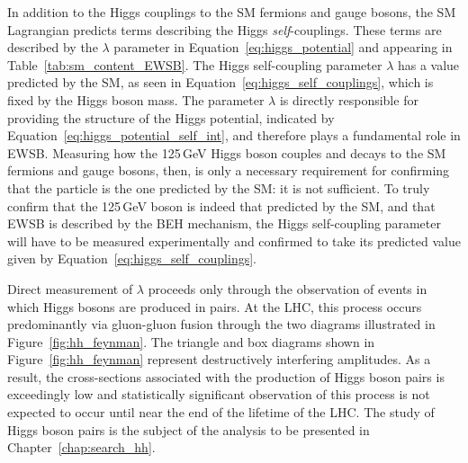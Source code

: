 In addition to the Higgs couplings to the SM fermions and gauge bosons, the SM Lagrangian
predicts terms describing the Higgs \textit{self}-couplings.
These terms are described by the $\lambda$ parameter in Equation~\ref{eq:higgs_potential}
and appearing in Table~\ref{tab:sm_content_EWSB}.
The Higgs self-coupling parameter $\lambda$ has a value predicted by the SM, as seen in 
Equation~\ref{eq:higgs_self_couplings}, which is fixed by the Higgs boson mass.
The parameter $\lambda$ is directly responsible for providing the structure of the Higgs potential,
indicated by Equation~\ref{eq:higgs_potential_self_int}, and therefore plays a fundamental
role in EWSB.
Measuring how the 125\,GeV Higgs boson couples and decays to the SM fermions and gauge bosons,
then, is only a necessary requirement for confirming that the particle is the one predicted by
the SM: it is not sufficient.
To truly confirm that the 125\,GeV boson is indeed that predicted by the SM, and that EWSB
is described by the BEH mechanism, the Higgs self-coupling parameter will have to be measured
experimentally and confirmed to take its predicted value given by Equation~\ref{eq:higgs_self_couplings}.

Direct measurement of $\lambda$ proceeds only through the observation of events in which Higgs bosons
are produced in pairs.
At the LHC, this process occurs predominantly via gluon-gluon fusion through the two diagrams illustrated
in Figure~\ref{fig:hh_feynman}.
The triangle and box diagrams shown in Figure~\ref{fig:hh_feynman} represent destructively interfering amplitudes.
As a result, the cross-sections associated with the production of Higgs boson pairs is exceedingly low
and statistically significant observation of this process is not expected to occur until
near the end of the lifetime of the LHC.
The study of Higgs boson pairs is the subject of the analysis to be presented in Chapter~\ref{chap:search_hh}.

